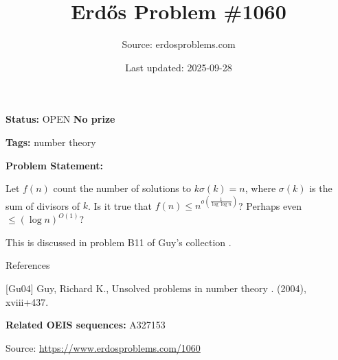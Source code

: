 \documentclass{article}
\title{Erd\H{o}s Problem \#1060}
\date{Last updated: 2025-09-28}
\author{Source: erdosproblems.com}
\begin{document}
\maketitle

\noindent\textbf{Status:} OPEN \quad \textbf{No prize}

\noindent\textbf{Tags:} number theory

\medskip

\noindent\textbf{Problem Statement:}

Let $f(n)$ count the number of solutions to $k\sigma(k)=n$, where $\sigma(k)$ is the sum of divisors of $k$. Is it true that $f(n)\leq n^{o(\frac{1}{\log\log n})}$? Perhaps even $\leq (\log n)^{O(1)}$?




This is discussed in problem B11 of Guy's collection \cite{Gu04}.




References

[Gu04] Guy, Richard K., Unsolved problems in number theory . (2004), xviii+437.

\noindent\textbf{Related OEIS sequences:} A327153


\bigskip
\noindent\small{Source: \url{https://www.erdosproblems.com/1060}}
\end{document}
